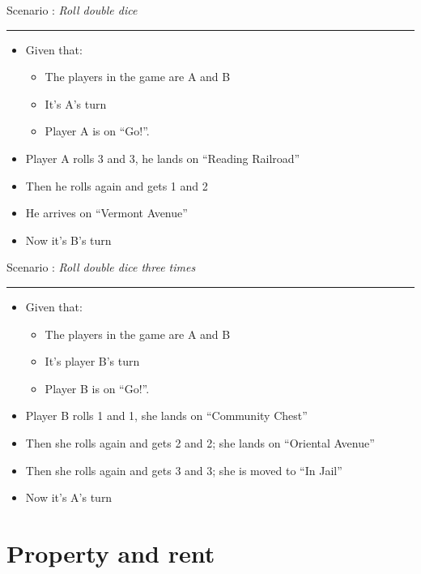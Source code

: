 \documentclass[handout,t,12pt]{beamer}
\newcommand{\Square}[1]{``#1''}
\newcounter{scenarioid}\setcounter{scenarioid}{0}
\newenvironment{scenario}[1]{%
\addtocounter{scenarioid}{1} 
{\Large Scenario \thescenarioid: \emph{#1}\\[3px]\hrule}
\vspace{1\bigskipamount}
}{%
}
\begin{document}
  \begin{frame}
    \begin{scenario}{Roll double dice}
      \begin{itemize}
        \item Given that:
        \begin{itemize}
          \item The players in the game are A and B
          \item It's A's turn
          \item Player A is on \Square{Go!}.
        \end{itemize}
        \item Player A rolls 3 and 3, he lands on \Square{Reading Railroad}
        \item Then he rolls again and gets 1 and 2
        \item He arrives on \Square{Vermont Avenue}
        \item Now it's B's turn
      \end{itemize}
    \end{scenario}
  \end{frame}

  \begin{frame}
    \begin{scenario}{Roll double dice three times}
      \begin{itemize}
        \item Given that:
        \begin{itemize}
          \item The players in the game are A and B
          \item It's player B's turn
          \item Player B is on \Square{Go!}.
        \end{itemize}
        \item Player B rolls 1 and 1, she lands on \Square{Community Chest}
        \item Then she rolls again and gets 2 and 2; she lands on \Square{Oriental Avenue}
        \item Then she rolls again and gets 3 and 3; she is moved to \Square{In Jail}
        \item Now it's A's turn
      \end{itemize}
    \end{scenario}
  \end{frame}
  
  \section{Property and rent}
\end{document}
